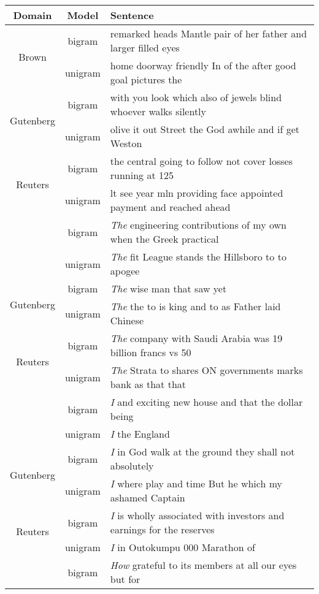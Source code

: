 \begin{tabular}{c|c|l}
  \textbf{Domain} & \textbf{Model} & \textbf{Sentence} \\\hline
  \multirow{2}{*}{Brown} & bigram & remarked heads Mantle pair of her father and larger filled eyes \\
  & unigram & home doorway friendly In of the after good goal pictures the \\ \hline
  \multirow{2}{*}{Gutenberg} & bigram & with you look which also of jewels blind whoever walks silently \\\
  & unigram & olive it out Street the God awhile and if get Weston \\\hline
  \multirow{2}{*}{Reuters} & bigram & the central going to follow not cover losses running at 125 \\
  & unigram & lt see year mln providing face appointed payment and reached ahead \\\hhline{|=|=|=|}
  \multirow{2}{*}{Brown}  & bigram & \emph{The} engineering contributions of my own when the Greek  practical \\
   & unigram & \emph{The} fit League stands the Hillsboro to to apogee \\\hline
  \multirow{2}{*}{Gutenberg} & bigram & \emph{The} wise man that saw yet \\\
   & unigram & \emph{The} the to is king and to as Father laid Chinese \\\hline
  \multirow{2}{*}{Reuters} & bigram & \emph{The} company with Saudi Arabia was 19 billion francs vs 50 \\
   & unigram & \emph{The} Strata to shares ON governments marks bank as that that \\\hhline{|=|=|=|}
  \multirow{2}{*}{Brown}  & bigram & \emph{I} and exciting new house and that the dollar being  \\
   & unigram & \emph{I} the England \\\hline
  \multirow{2}{*}{Gutenberg} & bigram & \emph{I} in God walk at the ground they shall not absolutely \\\
   & unigram & \emph{I} where play and time But he which my ashamed Captain \\\hline
  \multirow{2}{*}{Reuters} & bigram & \emph{I} is wholly associated with investors and earnings for the reserves \\
   & unigram & \emph{I} in Outokumpu 000 Marathon of \\\hhline{|=|=|=|} 
  \multirow{2}{*}{Brown} & bigram & \emph{How} grateful to its members at all our eyes but for \\

\end{tabular}
